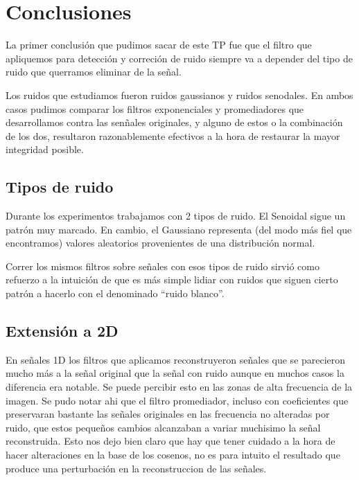 \section{Conclusiones}

La primer conclusi\'on que pudimos sacar de este TP fue que el filtro que apliquemos para detecci\'on y correci\'on
de ruido siempre va a depender del tipo de ruido que querramos eliminar de la se\~nal.

Los ruidos que estudiamos fueron ruidos gaussianos y ruidos senodales. En ambos casos pudimos comparar los filtros
exponenciales y promediadores que desarrollamos contra las sen\~nales originales, y alguno de estos o la combinaci\'on de los dos,
resultaron razonablemente efectivos a la hora de restaurar la mayor integridad posible.

\subsection{Tipos de ruido}

Durante los experimentos trabajamos con 2 tipos de ruido. El Senoidal sigue un
patr\'on muy marcado. En cambio, el Gaussiano representa (del modo m\'as fiel
que encontramos) valores aleatorios provenientes de una distribuci\'on normal.

Correr los mismos filtros sobre se\~nales con esos tipos de ruido sirvi\'o como
refuerzo a la intuici\'on de que es m\'as simple lidiar con ruidos que siguen
cierto patr\'on a hacerlo con el denominado ``ruido blanco''.

\subsection{Extensi\'on a 2D}

En se\~nales 1D los filtros que aplicamos reconstruyeron se\~nales que se parecieron mucho m\'as a la se\~nal
original que la se\~nal con ruido aunque en muchos casos la diferencia era notable. Se puede percibir esto en las zonas
de alta frecuencia de la imagen. Se pudo notar ahi que el filtro promediador, incluso con coeficientes que preservaran
bastante las se\~nales originales en las frecuencia no alteradas por ruido, que estos peque\~nos cambios alcanzaban a
variar muchisimo la se\~nal reconstruida. Esto nos dejo bien claro que hay que tener cuidado a la hora de hacer alteraciones
en la base de los cosenos, no es para intuito el resultado que produce una perturbaci\'on en la reconstruccion de las se\~nales.

